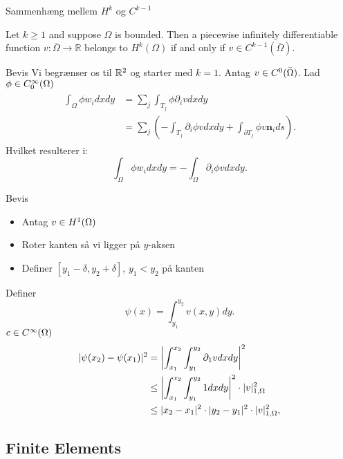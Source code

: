 \begin{frame}{Sammenhæng mellem $H^k$ og $C^{k-1}$}
   \begin{theorem}
    Let $k\geq1$ and suppose $\Omega$ is bounded. Then a piecewise infinitely differentiable function $v:\bar{\Omega}\rightarrow \mathbb{R}$
    belongs to $H^k(\Omega)$ if and only if $v\in C^{k-1}(\bar{\Omega})$.
   \end{theorem} 
\end{frame}
\begin{frame}{Bevis}
    Vi begrænser os til $\mathbb{R}^2$ og starter med $k=1$. Antag $v\in C^0(\bar{\Omega})$. 
    Lad $\phi \in C^\infty_0(\Omega)$
    \begin{align}
    \begin{split}
    \int_\Omega \phi w_i dxdy &= \sum_j\int_{T_j} \phi \partial_i v dx dy \\
        &= \sum_j \left( -\int_{T_j} \partial_i \phi v dxdy + \int_{\partial T_j} \phi v \mathbf{n}_i ds\right).
    \end{split}
    \end{align}
    Hvilket resulterer i:
    \begin{equation}
        \int_\Omega \phi w_i dxdy = -\int_\Omega \partial_i \phi v dxdy.
    \end{equation}
\end{frame}
\begin{frame}{Bevis}
   \begin{itemize}
    \item Antag $v\in H^1(\Omega)$ 
    \item Roter kanten så vi ligger på $y$-aksen 
    \item Definer $[y_1-\delta, y_2 +\delta]$, $y_1<y_2$ på kanten
   \end{itemize} 
   Definer 
    \begin{equation}
        \psi (x) = \int_{y_1}^{y_2} v(x,y) dy.
    \end{equation}
    $c\in C^\infty(\Omega)$
    \begin{align}
        |\psi(x_2) -\psi(x_1)|^2 &= \left| \int_{x_1}^{x_2} \int_{y_1}^{y_2} \partial_1 v dx dy \right|^2\\
        &\leq \left| \int_{x_1}^{x_2} \int_{y_1}^{y_2} 1 dx dy \right|^2 \cdot | v |_{1, \Omega}^2\\
        &\leq |x_2 - x_1|^2 \cdot |y_2 - y_1|^2 \cdot | v |_{1, \Omega}^2,
    \end{align}
\end{frame}
\subsection{Finite Elements}

